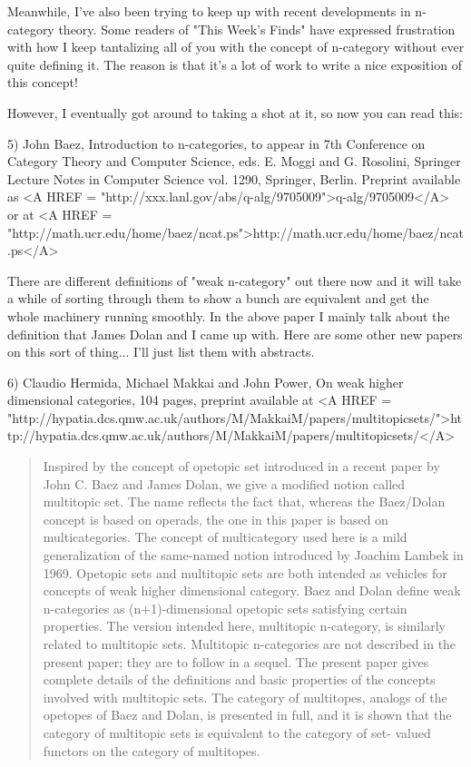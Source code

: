 Meanwhile, I've also been trying to keep up with recent developments
in n-category theory.  Some readers of "This Week's Finds" have expressed
frustration with how I keep tantalizing all of you with the concept of
n-category without ever quite defining it.  The reason is that it's a
lot of work to write a nice exposition of this concept!  

However, I eventually got around to taking a shot at it, so now you can
read this:

5) John Baez, Introduction to n-categories, to appear in
7th Conference on Category Theory and Computer Science, eds.
E. Moggi and G. Rosolini, Springer Lecture Notes in
Computer Science vol. 1290, Springer, Berlin.  Preprint available
as <A HREF = "http://xxx.lanl.gov/abs/q-alg/9705009">q-alg/9705009</A> or
at <A HREF = "http://math.ucr.edu/home/baez/ncat.ps">http://math.ucr.edu/home/baez/ncat.ps</A>

There are different definitions of "weak n-category" out there now and
it will take a while of sorting through them to show a bunch are
equivalent and get the whole machinery running smoothly.  In the
above paper I mainly talk about the definition that James Dolan
and I came up with.  Here are some other new papers on this sort of
thing... I'll just list them with abstracts.

6) Claudio Hermida, Michael Makkai and John Power, On weak higher 
dimensional categories, 104 pages, preprint available at 
<A HREF =
"http://hypatia.dcs.qmw.ac.uk/authors/M/MakkaiM/papers/multitopicsets/">http://hypatia.dcs.qmw.ac.uk/authors/M/MakkaiM/papers/multitopicsets/</A>

\begin{quote}
Inspired by the concept of opetopic set introduced in a recent
paper by John C. Baez and James Dolan, we give a modified notion
called multitopic set.  The name reflects the fact that, whereas
the Baez/Dolan concept is based on operads, the one in this paper
is based on multicategories.  The concept of multicategory used here
is a mild generalization of the same-named notion introduced by
Joachim Lambek in 1969.  Opetopic sets and multitopic sets are both
intended as vehicles for concepts of weak higher dimensional category.
Baez and Dolan define weak n-categories as (n+1)-dimensional opetopic
sets satisfying certain properties.  The version intended here, 
multitopic n-category, is similarly related to multitopic sets.  
Multitopic n-categories are not described in the present paper;
they are to follow in a sequel.  The present paper gives complete details
of the definitions and basic properties of the concepts involved with 
multitopic sets.  The category of multitopes, analogs of the opetopes
of Baez and Dolan, is presented in full, and it is shown that the 
category of multitopic sets is equivalent to the category of set-
valued functors on the category of multitopes.
\end{quote}

